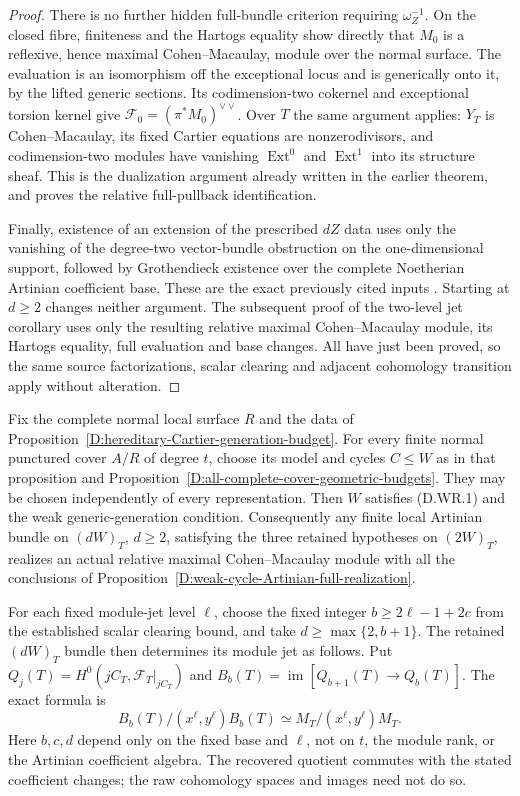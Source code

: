 \begin{proof}
There is no further hidden full-bundle criterion requiring
$\omega_Z^{-1}$. On the closed fibre, finiteness and the
Hartogs equality show directly that $M_0$ is a reflexive,
hence maximal Cohen--Macaulay, module over the normal surface.
The evaluation is an isomorphism off the exceptional locus
and is generically onto it, by the lifted generic sections.
Its codimension-two cokernel and exceptional torsion kernel
give $\mathcal F_0=(\pi^*M_0)^{\vee\vee}$. Over $T$ the
same argument applies: $Y_T$ is Cohen--Macaulay, its fixed
Cartier equations are nonzerodivisors, and codimension-two
modules have vanishing $\operatorname{Ext}^0$ and
$\operatorname{Ext}^1$ into its structure sheaf. This is the
dualization argument already written in the earlier theorem,
and proves the relative full-pullback identification.

Finally, existence of an extension of the prescribed $dZ$
data uses only the vanishing of the degree-two vector-bundle
obstruction on the one-dimensional support, followed by
Grothendieck existence over the complete Noetherian Artinian
coefficient base. These are the exact previously cited inputs
\citep[Tags 08MF and 0885]{StacksRelativeKahnB}. Starting at
$d\ge2$ changes neither argument. The subsequent proof of
the two-level jet corollary uses only the resulting relative
maximal Cohen--Macaulay module, its Hartogs equality, full
evaluation and base changes. All have just been proved, so
the same source factorizations, scalar clearing and adjacent
cohomology transition apply without alteration.
\end{proof}

\begin{corollary}
\label{D:hereditary-weak-cycle-relative-realization}
Fix the complete normal local surface $R$ and the data of
Proposition~\ref{D:hereditary-Cartier-generation-budget}.
For every finite normal punctured cover $A/R$ of degree $t$,
choose its model and cycles $C\le W$ as in that proposition
and Proposition~\ref{D:all-complete-cover-geometric-budgets}.
They may be chosen independently of every representation.
Then $W$ satisfies (D.WR.1) and the weak generic-generation
condition. Consequently any finite local Artinian bundle on
$(dW)_T$, $d\ge2$, satisfying the three retained hypotheses
on $(2W)_T$, realizes an actual relative maximal
Cohen--Macaulay module with all the conclusions of
Proposition~\ref{D:weak-cycle-Artinian-full-realization}.

For each fixed module-jet level $\ell$, choose the fixed
integer $b\ge2\ell-1+2c$ from the established scalar clearing
bound, and take $d\ge\max\{2,b+1\}$. The retained $(dW)_T$
bundle then determines its module jet as follows. Put
$Q_j(T)=H^0(jC_T,\mathcal F_T|_{jC_T})$ and
$B_b(T)=\operatorname{im}[Q_{b+1}(T)\to Q_b(T)]$.
The exact formula is
\[
 B_b(T)/(x^\ell,y^\ell)B_b(T)
       \simeq M_T/(x^\ell,y^\ell)M_T.                 \tag{D.WR.7}
\]
Here $b,c,d$ depend only on the fixed base and $\ell$, not on
$t$, the module rank, or the Artinian coefficient algebra.
The recovered quotient commutes with the stated coefficient
changes; the raw cohomology spaces and images need not do so.
\end{corollary}

